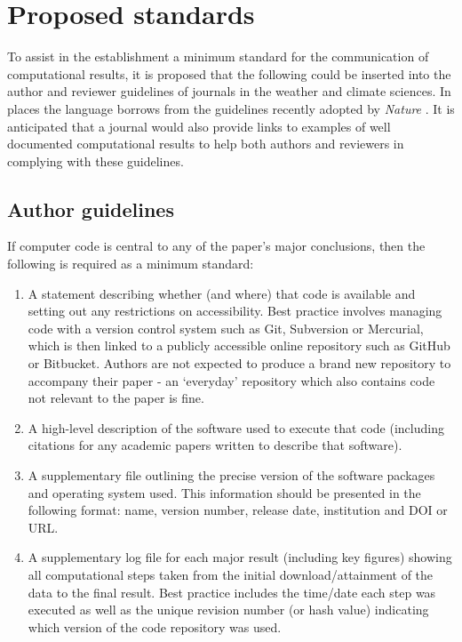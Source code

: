 \section{Proposed standards}

To assist in the establishment a minimum standard for the communication of computational results, it is proposed that the following could be inserted into the author and reviewer guidelines of journals in the weather and climate sciences. In places the language borrows from the guidelines recently adopted by \textit{Nature} \citep{Nature2014}. It is anticipated that a journal would also provide links to examples of well documented computational results to help both authors and reviewers in complying with these guidelines.

\subsection{Author guidelines}

If computer code is central to any of the paper's major conclusions, then the following is required as a minimum standard: 
\begin{enumerate}
\item A statement describing whether (and where) that code is available and setting out any restrictions on accessibility. Best practice involves managing code with a version control system such as Git, Subversion or Mercurial, which is then linked to a publicly accessible online repository such as GitHub or Bitbucket. Authors are not expected to produce a brand new repository to accompany their paper - an `everyday' repository which also contains code not relevant to the paper is fine.  
\item A high-level description of the software used to execute that code (including citations for any academic papers written to describe that software).
\item A supplementary file outlining the precise version of the software packages and operating system used. This information should be presented in the following format: name, version number, release date, institution and DOI or URL.
\item A supplementary log file for each major result (including key figures) showing all computational steps taken from the initial download/attainment of the data to the final result. Best practice includes the time/date each step was executed as well as the unique revision number (or hash value) indicating which version of the code repository was used. 
\end{enumerate}

